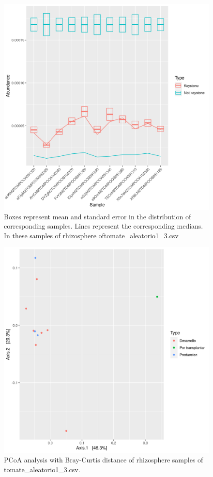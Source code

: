 \begin{figure}
 \centering
 \includegraphics[scale = 0.75]{mean_median_key_vs_not_key_tomate_aleatorio1_3.csv.png}
\caption{Boxes represent mean and standard error in the distribution of corresponding samples. Lines represent the corresponding medians. In these samples of rhizosphere oftomate_aleatorio1_3.csv}
\label{mean_median_tomate_aleatorio1_3.csv}
\end{figure}
\begin{figure}
   \centering
   \includegraphics[scale = 0.7]{pcoa_muestras_tomate_aleatorio1_3.csv.png}
 \caption{PCoA analysis with Bray-Curtis distance of rhizosphere samples of tomate_aleatorio1_3.csv.}
 \label{fig:tomate_aleatorio1_3.csv_pcoa}
\end{figure}
